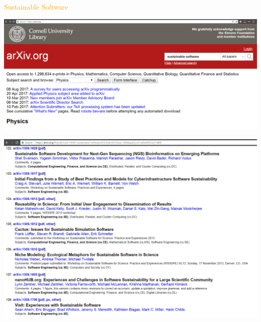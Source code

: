 \documentclass{beamer}
\begin{document}
\begin{frame}
    \centering
    
\end{frame}

\begin{frame}
\begin{center}
\textcolor{orange}{
    \Huge{Sustainable Software}}
\end{center}
\end{frame}

\begin{frame}
\begin{center}
    \includegraphics[width=\textwidth, height=0.5\textwidth]{static/arxiv_search.png}
\end{center}
\end{frame}

\begin{frame}
\begin{center}
    \includegraphics[width=\textwidth]{static/arxiv_result.png}
\end{center}
\end{frame}
\end{document}

